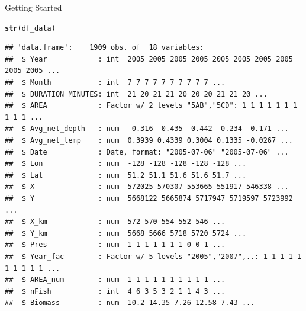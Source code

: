 \documentclass{beamer}\usepackage[]{graphicx}\usepackage[]{color}
\makeatletter
\newcommand{\hlstd}[1]{\textcolor[rgb]{0.345,0.345,0.345}{#1}}%
\newcommand{\hlkwd}[1]{\textcolor[rgb]{0.737,0.353,0.396}{\textbf{#1}}}%
\newenvironment{kframe}{%
 \def\at@end@of@kframe{}%
 \ifinner\ifhmode%
  \def\at@end@of@kframe{\end{minipage}}%
  \begin{minipage}{\columnwidth}%
 \fi\fi%
 \def\FrameCommand##1{\hskip\@totalleftmargin \hskip-\fboxsep
 \colorbox{shadecolor}{##1}\hskip-\fboxsep
     \hskip-\linewidth \hskip-\@totalleftmargin \hskip\columnwidth}%
 \MakeFramed {\advance\hsize-\width
   \@totalleftmargin\z@ \linewidth\hsize
   \@setminipage}}%
 {\par\unskip\endMakeFramed%
 \at@end@of@kframe}
\newenvironment{knitrout}{}{} %
\makeatother
\begin{document}
\begin{frame}[fragile]{Getting Started}
\begin{knitrout}\scriptsize
{}\color{fgcolor}\begin{kframe}
\begin{alltt}
  \hlkwd{str}\hlstd{(df_data)}
\end{alltt}
\begin{verbatim}
## 'data.frame':	1909 obs. of  18 variables:
##  $ Year            : int  2005 2005 2005 2005 2005 2005 2005 2005 2005 2005 ...
##  $ Month           : int  7 7 7 7 7 7 7 7 7 7 ...
##  $ DURATION_MINUTES: int  21 20 21 21 20 20 20 21 21 20 ...
##  $ AREA            : Factor w/ 2 levels "5AB","5CD": 1 1 1 1 1 1 1 1 1 1 ...
##  $ Avg_net_depth   : num  -0.316 -0.435 -0.442 -0.234 -0.171 ...
##  $ Avg_net_temp    : num  0.3939 0.4339 0.3004 0.1335 -0.0267 ...
##  $ Date            : Date, format: "2005-07-06" "2005-07-06" ...
##  $ Lon             : num  -128 -128 -128 -128 -128 ...
##  $ Lat             : num  51.2 51.1 51.6 51.6 51.7 ...
##  $ X               : num  572025 570307 553665 551917 546338 ...
##  $ Y               : num  5668122 5665874 5717947 5719597 5723992 ...
##  $ X_km            : num  572 570 554 552 546 ...
##  $ Y_km            : num  5668 5666 5718 5720 5724 ...
##  $ Pres            : num  1 1 1 1 1 1 1 0 0 1 ...
##  $ Year_fac        : Factor w/ 5 levels "2005","2007",..: 1 1 1 1 1 1 1 1 1 1 ...
##  $ AREA_num        : num  1 1 1 1 1 1 1 1 1 1 ...
##  $ nFish           : int  4 6 3 5 3 2 1 1 4 3 ...
##  $ Biomass         : num  10.2 14.35 7.26 12.58 7.43 ...
\end{verbatim}
\end{kframe}
\end{knitrout}
\end{frame}

\end{document}
